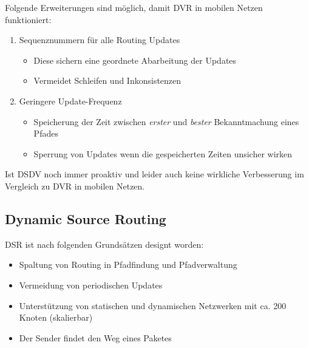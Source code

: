 			Folgende Erweiterungen sind möglich, damit DVR in mobilen Netzen funktioniert:
			\begin{enumerate}
				\item Sequenznummern für alle Routing Updates
					\begin{itemize}
						\item Diese sichern eine geordnete Abarbeitung der Updates
						\item Vermeidet Schleifen und Inkonsistenzen
					\end{itemize}
				\item Geringere Update-Frequenz
					\begin{itemize}
						\item Speicherung der Zeit zwischen \textit{erster} und \textit{bester} Bekanntmachung eines Pfades
						\item Sperrung von Updates wenn die gespeicherten Zeiten unsicher wirken
					\end{itemize}
			\end{enumerate}

			Ist DSDV noch immer proaktiv und leider auch keine wirkliche Verbesserung im Vergleich zu DVR in mobilen Netzen.

		\subsection{Dynamic Source Routing}
			DSR ist nach folgenden Grundsätzen designt worden:
			\begin{itemize}
				\item Spaltung von Routing in Pfadfindung und Pfadverwaltung
				\item Vermeidung von periodischen Updates
				\item Unterstützung von statischen und dynamischen Netzwerken mit ca. 200 Knoten (skalierbar)
				\item Der Sender findet den Weg eines Paketes
			\end{itemize}

